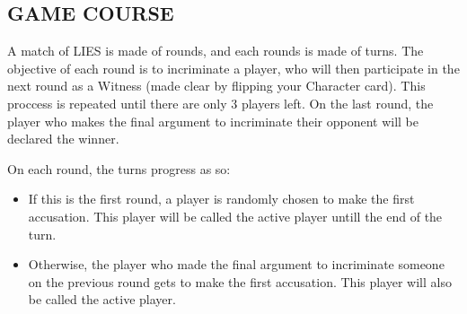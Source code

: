 \documentclass[a4paper, 11pt]{article}
\begin{document}
\subsection*{GAME COURSE}

	A match of LIES is made of rounds, and each rounds is made of turns. The objective of each round is to incriminate a player, who will then participate in the next round as a Witness (made clear by flipping your Character card). This proccess is repeated until there are only 3 players left. On the last round, the player who makes the final argument to incriminate their opponent will be declared the winner.

	On each round, the turns progress as so:

	\begin{itemize}
		\item If this is the first round, a player is randomly chosen to make the first accusation. This player will be called the active player untill the end of the turn.

		\item Otherwise, the player who made the final argument to incriminate someone on the previous round gets to make the first accusation. This player will also be called the active player.
	\end{itemize}
\end{document}
